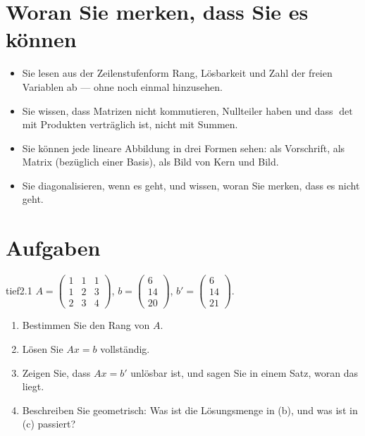 \section{Woran Sie merken, dass Sie es können}
\begin{itemize}[leftmargin=1.2em,itemsep=2pt]
\item Sie lesen aus der Zeilenstufenform Rang, Lösbarkeit und Zahl der freien Variablen ab --- ohne noch einmal hinzusehen.
\item Sie wissen, dass Matrizen nicht kommutieren, Nullteiler haben und dass $\det$ mit Produkten verträglich ist, nicht mit Summen.
\item Sie können jede lineare Abbildung in drei Formen sehen: als Vorschrift, als Matrix (bezüglich einer Basis), als Bild von Kern und Bild.
\item Sie diagonalisieren, wenn es geht, und wissen, woran Sie merken, dass es nicht geht.
\end{itemize}

\section{Aufgaben}

\begin{karte}{tief}{2.1}{\typtypisch}{}
$A = \begin{pmatrix}1 & 1 & 1\\ 1 & 2 & 3\\ 2 & 3 & 4\end{pmatrix}$, $b = \begin{pmatrix}6\\ 14\\ 20\end{pmatrix}$, $b' = \begin{pmatrix}6\\ 14\\ 21\end{pmatrix}$.
\begin{enumerate}[label=(\alph*),leftmargin=1.6em,itemsep=2pt]
\item Bestimmen Sie den Rang von $A$.
\item Lösen Sie $Ax = b$ vollständig.
\item Zeigen Sie, dass $Ax = b'$ unlösbar ist, und sagen Sie in einem Satz, woran das liegt.
\item Beschreiben Sie geometrisch: Was ist die Lösungsmenge in (b), und was ist in (c) passiert?
\end{enumerate}
\end{karte}

